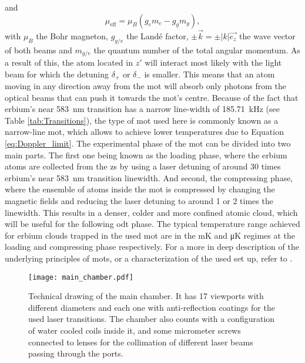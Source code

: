 and
\begin{equation}\label{eq:mu_eff}
	\mu_{ \text{eff} } = \mu_B (g_e m_e - g_g m_g),
\end{equation}
with $\mu_B$ the Bohr magneton, $g_{g/e}$ the Landé factor, $\pm \vec{k} = \pm |k| \vec{e_z}$ the wave vector of both beams and $m_{g/e}$ the quantum number of the total angular momentum. As a result of this, the atom located in $z'$ will interact most likely with the light beam for which the detuning $\delta_+$ or $\delta_-$ is smaller. This means that an atom moving in any direction away from the \ac{mot} will absorb only photons from the optical beams that can push it towards the \ac{mot}'s centre. Because of the fact that erbium's near \SI{583}{\nano\meter} transition has a narrow line-width of \SI{185.71}{\kilo\hertz} (see Table \ref{tab:Transitions}), the type of \ac{mot} used here is commonly known as a narrow-line \ac{mot}, which allows to achieve lower temperatures due to Equation \eqref{eq:Doppler_limit}. The experimental phase of the \ac{mot} can be divided into two main parts. The first one being known as the loading phase, where the erbium atoms are collected from the \ac{zs} by using a laser detuning of around 30 times erbium's near \SI{583}{\nano\meter} transition linewidth. And second, the compressing phase, where the ensemble of atoms inside the \ac{mot} is compressed by changing the magnetic fields and reducing the laser detuning to around 1 or 2 times the linewidth. This results in a denser, colder and more confined atomic cloud, which will be useful for the following \ac{odt} phase. The typical temperature range achieved for erbium clouds trapped in the used \ac{mot} are in the \si{\milli\kelvin} and \si{\micro\kelvin} regimes at the loading and compressing phase respectively. For a more in deep description of the underlying principles of \Aclp{mot}, or a characterization of the used set up, refer to \cite{Metcalf1999, Ulitzsch2016, Roell2016}. 

\begin{figure}[!htbp]\centering
	\texttt{[image: main\_chamber.pdf]}
	\caption[Technical drawing of the main chamber]{Technical drawing of the main chamber. It has 17 viewports with different diameters and each one with anti-reflection coatings for the used laser transitions. The chamber also counts with a configuration of water cooled coils inside it, and some micrometer screws connected to lenses for the collimation of different laser beams passing through the ports. }\label{fig:main_chamber}
\end{figure}

